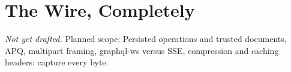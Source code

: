 \chapter{The Wire, Completely}
\label{ch:the-wire-completely}

\emph{Not yet drafted.} Planned scope: Persisted operations and trusted documents, APQ, multipart  framing, graphql-ws versus SSE, compression and caching headers: capture every byte.

% 
